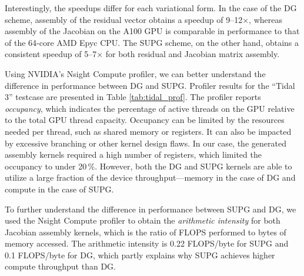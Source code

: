 
Interestingly, the speedups differ for each variational form. In the case of the DG scheme, assembly of the residual vector obtains a speedup of 9--12${\times}$, whereas assembly of the Jacobian on the A100 GPU is comparable in performance to that of the 64-core AMD Epyc CPU. The SUPG scheme, on the other hand, obtains a consistent speedup of 5--7${\times}$ for both residual and Jacobian matrix assembly.

Using NVIDIA's Nsight Compute profiler, we can better understand the difference in performance between DG and SUPG.
Profiler results for the ``Tidal 3'' testcase are presented in Table \ref{tab:tidal_prof}. The profiler reports \textit{occupancy}, which indicates the percentage of active threads on the GPU relative to the total GPU thread capacity. Occupancy can be limited by the resources needed per thread, such as shared memory or registers. It can also be impacted by excessive branching or other kernel design flaws. In our case, the generated assembly kernels required a high number of registers, which limited the occupancy to under 20\,\%. However, both the DG and SUPG kernels are able to utilize a large fraction of the device throughput---memory in the case of DG and compute in the case of SUPG.

To further understand the difference in performance between SUPG and DG, we used the Nsight Compute profiler to obtain the \textit{arithmetic intensity} for both Jacobian assembly kernels, which is the ratio of FLOPS performed to bytes of memory accessed. The arithmetic intensity is 0.22 FLOPS/byte for SUPG and 0.1 FLOPS/byte for DG, which partly explains why SUPG achieves higher compute throughput than DG.

